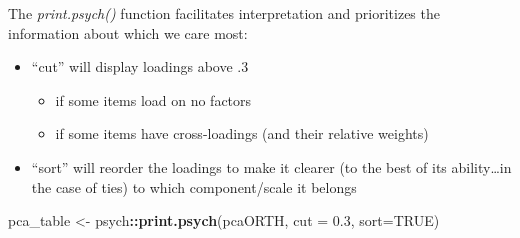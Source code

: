 \documentclass[
  english,
]{book}
\newenvironment{Shaded}{\begin{snugshade}}{\end{snugshade}}
\newcommand{\DataTypeTok}[1]{\textcolor[rgb]{0.13,0.29,0.53}{#1}}
\newcommand{\FloatTok}[1]{\textcolor[rgb]{0.00,0.00,0.81}{#1}}
\newcommand{\KeywordTok}[1]{\textcolor[rgb]{0.13,0.29,0.53}{\textbf{#1}}}
\newcommand{\NormalTok}[1]{#1}
\newcommand{\OperatorTok}[1]{\textcolor[rgb]{0.81,0.36,0.00}{\textbf{#1}}}
\newcommand{\OtherTok}[1]{\textcolor[rgb]{0.56,0.35,0.01}{#1}}
\newcommand{\StringTok}[1]{\textcolor[rgb]{0.31,0.60,0.02}{#1}}
\providecommand{\tightlist}{%
  \setlength{\itemsep}{0pt}\setlength{\parskip}{0pt}}
\begin{document}
The \emph{print.psych()} function facilitates interpretation and prioritizes the information about which we care most:

\begin{itemize}
\tightlist
\item
  ``cut'' will display loadings above .3

  \begin{itemize}
  \tightlist
  \item
    if some items load on no factors
  \item
    if some items have cross-loadings (and their relative weights)
  \end{itemize}
\item
  ``sort'' will reorder the loadings to make it clearer (to the best of its ability\ldots in the case of ties) to which component/scale it belongs
\end{itemize}

\begin{Shaded}
\begin{Highlighting}[]
\NormalTok{pca_table <-}\StringTok{ }\NormalTok{psych}\OperatorTok{::}\KeywordTok{print.psych}\NormalTok{(pcaORTH, }\DataTypeTok{cut =} \FloatTok{0.3}\NormalTok{, }\DataTypeTok{sort=}\OtherTok{TRUE}\NormalTok{)}
\end{Highlighting}
\end{Shaded}
\end{document}
